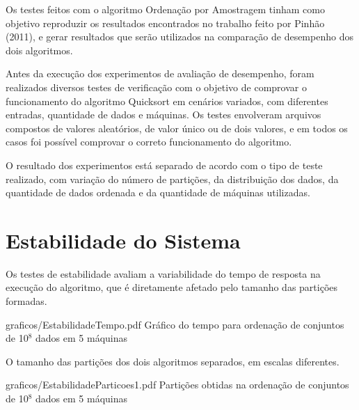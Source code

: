 Os testes feitos com o algoritmo Ordenação por Amostragem tinham como objetivo reproduzir os
resultados encontrados no trabalho feito por Pinhão (2011), e gerar resultados 
que serão utilizados na comparação de desempenho dos dois algoritmos. 


Antes da execução dos experimentos de avaliação de desempenho, foram realizados diversos
testes de verificação com o objetivo de comprovar o funcionamento do algoritmo Quicksort em cenários variados,
com diferentes entradas, quantidade de dados e máquinas.
Os testes envolveram arquivos compostos de valores aleatórios, de valor único ou de dois valores,
e em todos os casos foi possível comprovar o correto funcionamento do algoritmo.
 



O resultado dos experimentos está separado de acordo com o tipo de teste realizado, com variação do número de partições,
da distribuição dos dados, da quantidade de dados ordenada e da quantidade de máquinas utilizadas. 


\newpage
\section{Estabilidade do Sistema}

Os testes de estabilidade avaliam a variabilidade do tempo de resposta na execução do algoritmo, que é diretamente afetado pelo tamanho das partições formadas. 

\begin{defaultFigure}{0.75\textwidth}{graficos/EstabilidadeTempo.pdf}
{Gráfico do tempo para ordenação de conjuntos de 10$^8$ dados em 5 máquinas}
\label{fig:EstabilidadeTempo}
\end{defaultFigure}

O tamanho das partições dos dois algoritmos separados, em escalas diferentes.
\begin{defaultFigure}{0.75\textwidth}{graficos/EstabilidadeParticoes1.pdf}
{Partições obtidas na ordenação de conjuntos de 10$^8$ dados em 5 máquinas}
\label{fig:EstabilidadeParticoes}
\end{defaultFigure}


\newpage
